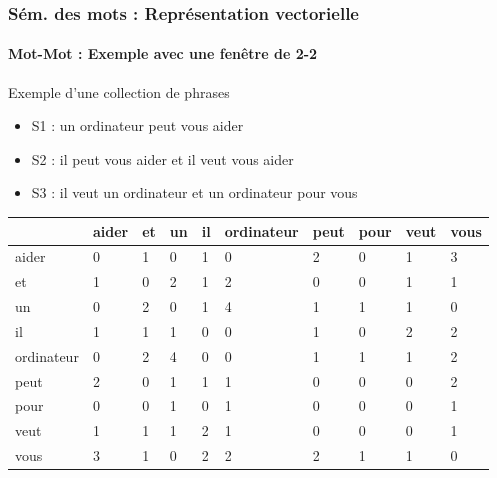 \documentclass[xcolor=table]{beamer}
\begin{document}
\begin{frame}
\frametitle{Sém. des mots : Représentation vectorielle}
\framesubtitle{Mot-Mot : Exemple avec une fenêtre de 2-2}

\begin{exampleblock}{Exemple d'une collection de phrases}
	\begin{itemize}
		\item S1 : un ordinateur peut vous aider
		\item S2 : il peut vous aider et il veut vous aider
		\item S3 : il veut un ordinateur et un ordinateur pour vous
	\end{itemize}
\end{exampleblock}

\begin{center}
	\scriptsize
	\begin{tabular}{llllllllll}
		\hline\hline
		 & aider & et & un & il & ordinateur & peut & pour & veut & vous \\
		 \hline
		aider & 0 & 1 & 0 & 1 & 0 & 2 & 0 & 1 & 3 \\
		et & 1 & 0 & 2 & 1 & 2 & 0 & 0 & 1 & 1 \\
		un & 0 & 2 & 0 & 1 & 4 & 1 & 1 & 1 & 0 \\
		il & 1 & 1 & 1 & 0 & 0 & 1 & 0 & 2 & 2 \\
		ordinateur & 0 & 2 & 4 & 0 & 0 & 1 & 1 & 1 & 2 \\
		peut & 2 & 0 & 1 & 1 & 1 & 0 & 0 & 0 & 2 \\
		pour & 0 & 0 & 1 & 0 & 1 & 0 & 0 & 0 & 1 \\
		veut & 1 & 1 & 1 & 2 & 1 & 0 & 0 & 0 & 1 \\
		vous & 3 & 1 & 0 & 2 & 2 & 2 & 1 & 1 & 0 \\
		\hline\hline
	\end{tabular}
\end{center}

\end{frame}
\end{document}
